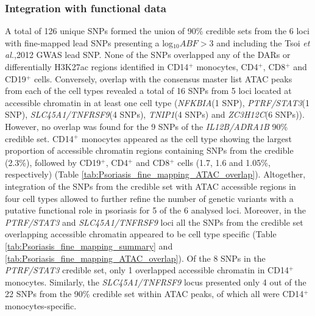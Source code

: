 \subsubsection{Integration with functional data}
A total of 126 unique SNPs formed the union of 90\% credible sets from the 6 loci with fine-mapped lead SNPs presenting a log$_{10}ABF>$3 and including the Tsoi \textit{et al.},2012 GWAS lead SNP. None of the SNPs overlapped any of the DARs or differentially H3K27ac regions identified in CD14$^+$ monocytes, CD4$^+$, CD8$^+$ and CD19$^+$ cells. Conversely, overlap with the consensus master list ATAC peaks from each of the cell types revealed a total of 16 SNPs from 5 loci located at accessible chromatin in at least one cell type (\textit{NFKBIA}(1 SNP), \textit{PTRF/STAT3}(1 SNP), \textit{SLC45A1/TNFRSF9}(4 SNPs), \textit{TNIP1}(4 SNPs) and \textit{ZC3H12C}(6 SNPs)). However, no overlap was found for the 9 SNPs of the \textit{IL12B/ADRA1B} 90\% credible set. CD14$^+$ monocytes appeared as the cell type showing the largest proportion of accessible chromatin regions containing SNPs from the credible (2.3\%), followed by CD19$^+$, CD4$^+$ and CD8$^+$ cells (1.7, 1.6 and 1.05\%, respectively) (Table \ref{tab:Psoriasis_fine_mapping_ATAC_overlap}). Altogether, integration of the SNPs from the credible set with ATAC accessible regions in four cell types allowed to further refine the number of genetic variants with a putative functional role in psoriasis for 5 of the 6 analysed loci. Moreover, in the \textit{PTRF/STAT3} and \textit{SLC45A1/TNFRSF9} loci all the SNPs from the credible set overlapping accessible chromatin appeared to be cell type specific (Table \ref{tab:Psoriasis_fine_mapping_summary} and \ref{tab:Psoriasis_fine_mapping_ATAC_overlap}). Of the 8 SNPs in the \textit{PTRF/STAT3} credible set, only 1 overlapped accessible chromatin in CD14$^+$ monocytes. Similarly, the \textit{SLC45A1/TNFRSF9} locus presented only 4 out of the 22 SNPs from the 90\% credible set within ATAC peaks, of which all were CD14$^+$ monocytes-specific.   

